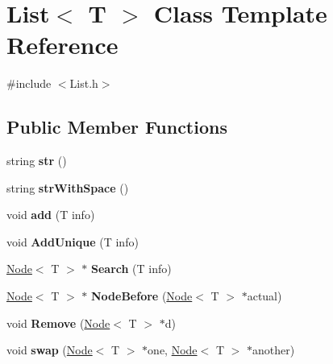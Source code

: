 \hypertarget{class_list}{\section{List$<$ T $>$ Class Template Reference}
\label{class_list}
}


{\ttfamily \#include $<$List.\-h$>$}

\subsection*{Public Member Functions}
\begin{DoxyCompactItemize}
\item 
\hypertarget{class_list_ae48f635f942950cb7cf02b489ce02add}{string {\bfseries str} ()}\label{class_list_ae48f635f942950cb7cf02b489ce02add}

\item 
\hypertarget{class_list_a601161369df6e3acb130416a294ea776}{string {\bfseries str\-With\-Space} ()}\label{class_list_a601161369df6e3acb130416a294ea776}

\item 
\hypertarget{class_list_a9dbfde48bd54fd5f15a2bfe3dced3571}{void {\bfseries add} (T info)}\label{class_list_a9dbfde48bd54fd5f15a2bfe3dced3571}

\item 
\hypertarget{class_list_a8d60d73e332944bdc5ab6a56a896d14d}{void {\bfseries Add\-Unique} (T info)}\label{class_list_a8d60d73e332944bdc5ab6a56a896d14d}

\item 
\hypertarget{class_list_a97a7ff0ff11dd7f44b0482a28ebe4c2c}{\hyperlink{class_node}{Node}$<$ T $>$ $\ast$ {\bfseries Search} (T info)}\label{class_list_a97a7ff0ff11dd7f44b0482a28ebe4c2c}

\item 
\hypertarget{class_list_a5f9333f05ec8cae798a4b2c13bb27350}{\hyperlink{class_node}{Node}$<$ T $>$ $\ast$ {\bfseries Node\-Before} (\hyperlink{class_node}{Node}$<$ T $>$ $\ast$actual)}\label{class_list_a5f9333f05ec8cae798a4b2c13bb27350}

\item 
\hypertarget{class_list_aeed300a4a7f2d87f0bce5f746e4e97aa}{void {\bfseries Remove} (\hyperlink{class_node}{Node}$<$ T $>$ $\ast$d)}\label{class_list_aeed300a4a7f2d87f0bce5f746e4e97aa}

\item 
\hypertarget{class_list_a65c23c9bdad36a6e00a39fc9869dd11b}{void {\bfseries swap} (\hyperlink{class_node}{Node}$<$ T $>$ $\ast$one, \hyperlink{class_node}{Node}$<$ T $>$ $\ast$another)}\label{class_list_a65c23c9bdad36a6e00a39fc9869dd11b}


\end{DoxyCompactItemize}
